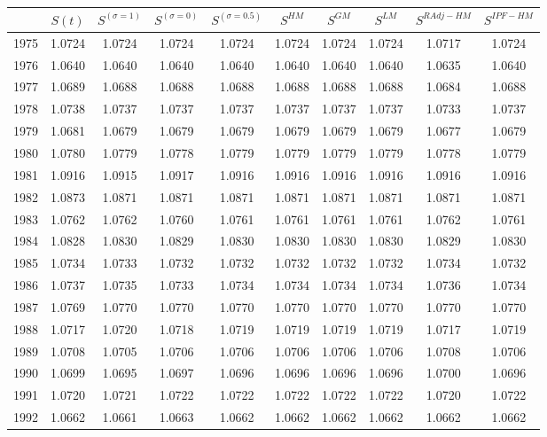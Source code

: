 \begin{tabular}{cccccccccc}
  \hline
 & $S(t)$ & $S^{(\sigma = 1)}$ & $S^{(\sigma = 0)}$ & $S^{(\sigma = 0.5)}$ & $S^{HM}$ & $S^{GM}$ & $S^{LM}$ & $S^{RAdj-HM}$ & $S^{IPF-HM}$ \\ 
  \hline
1975 & 1.0724 & 1.0724 & 1.0724 & 1.0724 & 1.0724 & 1.0724 & 1.0724 & 1.0717 & 1.0724 \\ 
  1976 & 1.0640 & 1.0640 & 1.0640 & 1.0640 & 1.0640 & 1.0640 & 1.0640 & 1.0635 & 1.0640 \\ 
  1977 & 1.0689 & 1.0688 & 1.0688 & 1.0688 & 1.0688 & 1.0688 & 1.0688 & 1.0684 & 1.0688 \\ 
  1978 & 1.0738 & 1.0737 & 1.0737 & 1.0737 & 1.0737 & 1.0737 & 1.0737 & 1.0733 & 1.0737 \\ 
  1979 & 1.0681 & 1.0679 & 1.0679 & 1.0679 & 1.0679 & 1.0679 & 1.0679 & 1.0677 & 1.0679 \\ 
  1980 & 1.0780 & 1.0779 & 1.0778 & 1.0779 & 1.0779 & 1.0779 & 1.0779 & 1.0778 & 1.0779 \\ 
  1981 & 1.0916 & 1.0915 & 1.0917 & 1.0916 & 1.0916 & 1.0916 & 1.0916 & 1.0916 & 1.0916 \\ 
  1982 & 1.0873 & 1.0871 & 1.0871 & 1.0871 & 1.0871 & 1.0871 & 1.0871 & 1.0871 & 1.0871 \\ 
  1983 & 1.0762 & 1.0762 & 1.0760 & 1.0761 & 1.0761 & 1.0761 & 1.0761 & 1.0762 & 1.0761 \\ 
  1984 & 1.0828 & 1.0830 & 1.0829 & 1.0830 & 1.0830 & 1.0830 & 1.0830 & 1.0829 & 1.0830 \\ 
  1985 & 1.0734 & 1.0733 & 1.0732 & 1.0732 & 1.0732 & 1.0732 & 1.0732 & 1.0734 & 1.0732 \\ 
  1986 & 1.0737 & 1.0735 & 1.0733 & 1.0734 & 1.0734 & 1.0734 & 1.0734 & 1.0736 & 1.0734 \\ 
  1987 & 1.0769 & 1.0770 & 1.0770 & 1.0770 & 1.0770 & 1.0770 & 1.0770 & 1.0770 & 1.0770 \\ 
  1988 & 1.0717 & 1.0720 & 1.0718 & 1.0719 & 1.0719 & 1.0719 & 1.0719 & 1.0717 & 1.0719 \\ 
  1989 & 1.0708 & 1.0705 & 1.0706 & 1.0706 & 1.0706 & 1.0706 & 1.0706 & 1.0708 & 1.0706 \\ 
  1990 & 1.0699 & 1.0695 & 1.0697 & 1.0696 & 1.0696 & 1.0696 & 1.0696 & 1.0700 & 1.0696 \\ 
  1991 & 1.0720 & 1.0721 & 1.0722 & 1.0722 & 1.0722 & 1.0722 & 1.0722 & 1.0720 & 1.0722 \\ 
  1992 & 1.0662 & 1.0661 & 1.0663 & 1.0662 & 1.0662 & 1.0662 & 1.0662 & 1.0662 & 1.0662 \\ 

\end{tabular}
